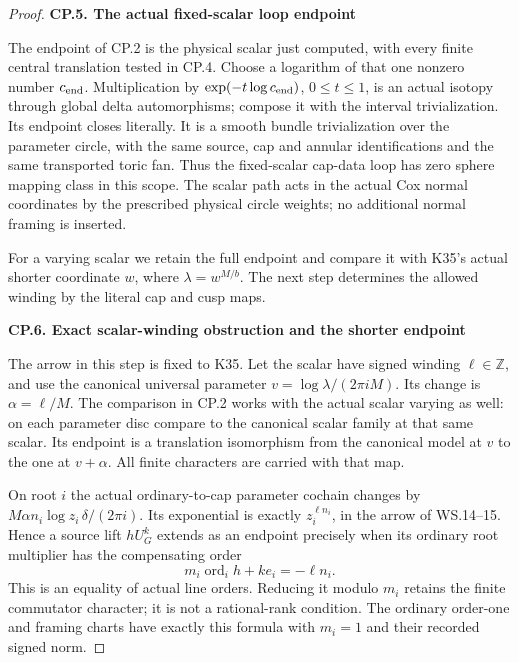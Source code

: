 \begin{proof}
\medskip\noindent\textbf{CP.5. The actual fixed-scalar loop endpoint}

\par\nobreak

The endpoint of CP.2 is the physical scalar just computed, with every
finite central translation tested in CP.4. Choose a logarithm of
that one nonzero number \(c_{\rm end}\). Multiplication by
\(\exp(-t\log c_{\rm end})\), \(0\leq t\leq1\), is an actual
isotopy through global delta automorphisms; compose it with the
interval trivialization. Its endpoint closes literally. It is a
smooth bundle trivialization over the parameter circle, with the
same source, cap and annular identifications and the same transported
toric fan. Thus the fixed-scalar cap-data loop has zero sphere
mapping class in this scope. The scalar path acts in the actual
Cox normal coordinates by the prescribed physical circle weights;
no additional normal framing is inserted.

For a varying scalar we retain the full endpoint and compare it
with K35's actual shorter coordinate \(w\), where
\(\lambda=w^{M/b}\). The next step determines the allowed winding
by the literal cap and cusp maps.

\par

\medskip\noindent\textbf{CP.6. Exact scalar-winding obstruction and the shorter endpoint}

\par\nobreak

The arrow in this step is fixed to K35.
Let the scalar have signed winding \(\ell\in\mathbb Z\), and use
the canonical universal parameter
\(v=\log\lambda/(2\pi iM)\). Its change is
\(\alpha=\ell/M\). The comparison in CP.2 works with the actual
scalar varying as well: on each parameter disc compare to the
canonical scalar family at that same scalar. Its endpoint is a
translation isomorphism from the canonical model at \(v\) to the one
at \(v+\alpha\). All finite characters are carried with that map.

On root \(i\) the actual ordinary-to-cap parameter cochain changes by
\(M\alpha n_i\log z_i\,\delta/(2\pi i)\). Its exponential is
exactly \(z_i^{\ell n_i}\), in the arrow of WS.14--15. Hence a
source lift \(hU_G^k\) extends as an endpoint precisely when its
ordinary root multiplier has the compensating order
\[
             m_i\operatorname{ord}_i h+k e_i=-\ell n_i.
                                                               \tag{CP.7}
\]
This is an equality of actual line orders. Reducing it modulo \(m_i\)
retains the finite commutator character; it is not a rational-rank
condition. The ordinary order-one and framing charts have exactly
this formula with \(m_i=1\) and their recorded signed norm.


\end{proof}
